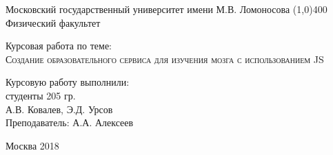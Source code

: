 \begin{titlepage}
\newpage

\begin{center}
\vspace{4cm}
{\large Московский государственный университет имени М.В. Ломоносова \line(1,0){400} \\
Физический факультет}

\end{center}

\vspace{8em}

\begin{center}
\Large 
\end{center}

\vspace{2.5em}

\begin{center}
{\large Курсовая работа по теме:}\\
\Large \textsc{Создание образовательного сервиса \linebreak для изучения мозга с использованием JS }
\end{center}

\vspace{12em}

\begin{flushright}
Курсовую работу выполнили: \\
студенты 205 гр.\\ А.В. Ковалев, Э.Д. Урсов \\
Преподаватель:
А.А. Алексеев 

\end{flushright}

\vspace{\fill}

\begin{center}
Москва 2018
\end{center}

\end{titlepage}